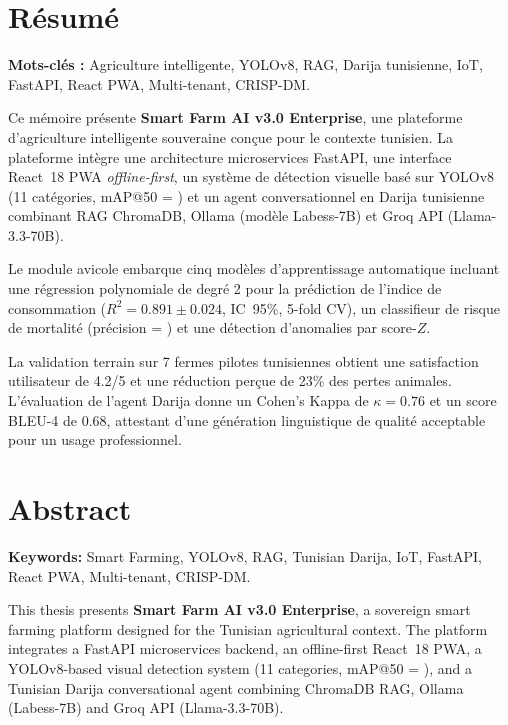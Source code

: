 \cleardoublepage
\thispagestyle{empty}
\chapter*{Résumé}
\begin{tcolorbox}[colback=gray!5,colframe=gray!50]
\textbf{Mots-clés :} Agriculture intelligente, YOLOv8, RAG, Darija tunisienne,
IoT, FastAPI, React PWA, Multi-tenant, CRISP-DM.
\end{tcolorbox}

\medskip
Ce mémoire présente \textbf{Smart Farm AI v3.0 Enterprise}, une plateforme
d'agriculture intelligente souveraine conçue pour le contexte tunisien.
La plateforme intègre une architecture microservices FastAPI, une interface
React~18 PWA \textit{offline-first}, un système de détection visuelle basé
sur YOLOv8 (11 catégories, mAP@50 = ) et un agent
conversationnel en Darija tunisienne combinant RAG ChromaDB, Ollama
(modèle Labess-7B) et Groq API (Llama-3.3-70B).

Le module avicole embarque cinq modèles d'apprentissage automatique incluant
une régression polynomiale de degré 2 pour la prédiction de l'indice de
consommation ($R^2 = 0.891 \pm 0.024$, IC~95\%, 5-fold CV), un classifieur
de risque de mortalité (précision = ) et une détection
d'anomalies par score-$Z$.

La validation terrain sur 7 fermes pilotes tunisiennes obtient une satisfaction
utilisateur de 4.2/5 et une réduction perçue de 23\% des pertes animales.
L'évaluation de l'agent Darija donne un Cohen's Kappa de $\kappa = 0.76$
et un score BLEU-4 de 0.68, attestant d'une génération linguistique de
qualité acceptable pour un usage professionnel.

\chapter*{Abstract}
\begin{tcolorbox}[colback=gray!5,colframe=gray!50]
\textbf{Keywords:} Smart Farming, YOLOv8, RAG, Tunisian Darija,
IoT, FastAPI, React PWA, Multi-tenant, CRISP-DM.
\end{tcolorbox}

\medskip
This thesis presents \textbf{Smart Farm AI v3.0 Enterprise}, a sovereign
smart farming platform designed for the Tunisian agricultural context.
The platform integrates a FastAPI microservices backend, an offline-first
React~18 PWA, a YOLOv8-based visual detection system (11 categories,
mAP@50 = ), and a Tunisian Darija conversational
agent combining ChromaDB RAG, Ollama (Labess-7B) and Groq API (Llama-3.3-70B).

